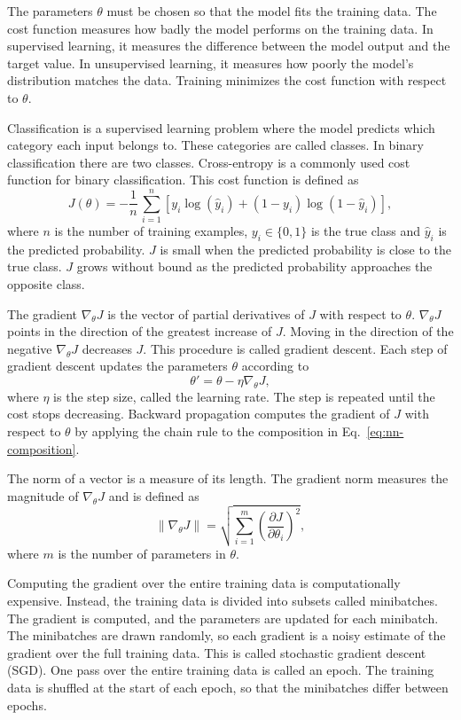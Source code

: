 The parameters $\theta$ must be chosen so that the model fits the training data. The cost function measures how badly the model performs on the training data. In supervised learning, it measures the difference between the model output and the target value. In unsupervised learning, it measures how poorly the model's distribution matches the data. Training minimizes the cost function with respect to $\theta$. 

Classification is a supervised learning problem where the model predicts which category each input belongs to. These categories are called classes. In binary classification there are two classes. Cross-entropy is a commonly used cost function for binary classification. This cost function is defined as 
\begin{equation}
   J(\theta) = -\frac{1}{n}\,\sum_{i=1}^{n}[y_i\log(\hat{y}_i) + (1-y_i)\log(1-\hat{y}_i)],
\end{equation}
where $n$ is the number of training examples, $y_i \in \{0,1\}$ is the true class and $\hat{y}_i$ is the predicted probability. $J$ is small when the predicted probability is close to the true class. $J$ grows without bound as the predicted probability approaches the opposite class.

The gradient $\nabla_{\theta}J$ is the vector of partial derivatives of $J$ with respect to $\theta$. $\nabla_{\theta}J$ points in the direction of the greatest increase of $J$. Moving in the direction of the negative $\nabla_{\theta}J$ decreases $J$. This procedure is called gradient descent. Each step of gradient descent updates the parameters $\theta$ according to
\begin{equation}
\theta' = \theta - \eta \nabla_{\theta}J,
\end{equation}
where $\eta$ is the step size, called the learning rate. The step is repeated until the cost stops decreasing. Backward propagation computes the gradient of $J$ with respect to $\theta$ by applying the chain rule to the composition in Eq.~\eqref{eq:nn-composition}.

The norm of a vector is a measure of its length. The gradient norm measures the magnitude of $\nabla_{\theta}J$ and is defined as
\begin{equation}
\|\nabla_{\theta}J\| = \sqrt{\sum_{i=1}^{m}\left(\frac{\partial J}{\partial \theta_i}\right)^2},
\end{equation}
where $m$ is the number of parameters in $\theta$.

Computing the gradient over the entire training data is computationally expensive. Instead, the training data is divided into subsets called minibatches. The gradient is computed, and the parameters are updated for each minibatch. The minibatches are drawn randomly, so each gradient is a noisy estimate of the gradient over the full training data. This is called stochastic gradient descent (SGD). One pass over the entire training data is called an epoch. The training data is shuffled at the start of each epoch, so that the minibatches differ between epochs.

